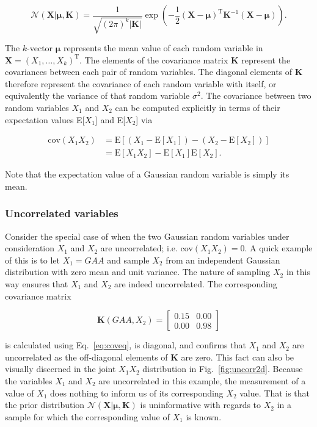 \begin{equation}
  \mathcal{N}(\mathbf{X}|\boldsymbol{\mu},\mathbf{K}) = \frac{1}{\sqrt{(2\pi)^k
      |\mathbf{K}|}} \exp{\left( -\frac{1}{2} (\mathbf{X} -
    \boldsymbol{\mu})^{\text{T}} \mathbf{K}^{-1} (\mathbf{X}-\boldsymbol{\mu})
    \right)}.
  \label{eq:gauss2d}
\end{equation}

\noindent The $k$-vector $\boldsymbol{\mu}$ represents the mean value of each
random variable in $\mathbf{X}=(X_1,\dots,X_k)^{\text{T}}$.
The elements of the covariance matrix
$\mathbf{K}$ represent the covariances between each pair of random variables.
The diagonal elements of $\mathbf{K}$ therefore represent the covariance of each
random variable with itself, or equivalently the variance of that random variable $\sigma^2$.
The covariance between two random variables $X_1$ and $X_2$ can be computed explicitly
in terms of their expectation values E[$X_1$] and E[$X_2$] via

\begin{align}
  \text{cov}(X_1X_2) &= \text{E}[(X_1-\text{E}[X_1]) - (X_2-\text{E}[X_2])] \\
  &= \text{E}[X_1X_2] - \text{E}[X_1]\text{E}[X_2].
  \label{eq:coveq}
\end{align}

\noindent Note that the expectation value of a Gaussian random variable is simply
its mean. \\

\subsubsection{Uncorrelated variables}
Consider the special case of when the two Gaussian random variables under
consideration $X_1$ and $X_2$ are uncorrelated; i.e. cov$(X_1X_2)=0$. A quick
example of this is to let $X_1=GAA$ and sample $X_2$ from an independent Gaussian
distribution with zero mean and unit variance.
The nature of sampling $X_2$ in this way ensures
that $X_1$ and $X_2$ are indeed uncorrelated. The corresponding covariance matrix

\begin{equation}
  \mathbf{K}(GAA,X_2) =
  \begin{bmatrix}
    0.15 & 0.00 \\
    0.00 & 0.98
  \end{bmatrix}
  \label{eq:Kuncorr}
\end{equation}

\noindent is calculated using Eq.~\ref{eq:coveq}, is diagonal, and confirms that
$X_1$ and $X_2$ are uncorrelated as the off-diagonal elements of $\mathbf{K}$ are zero.
This fact can also be visually discerned in the joint $X_1X_2$ distribution in
Fig.~\ref{fig:uncorr2d}. Because the variables $X_1$ and $X_2$ are uncorrelated in this
example, the measurement of a value of $X_1$ does nothing to inform us of its
corresponding $X_2$ value. That is that the prior distribution
$\mathcal{N}(\mathbf{X}|\boldsymbol{\mu},\mathbf{K})$ is uninformative with regards to
$X_2$ in a sample for which the corresponding value of $X_1$ is known. \\

